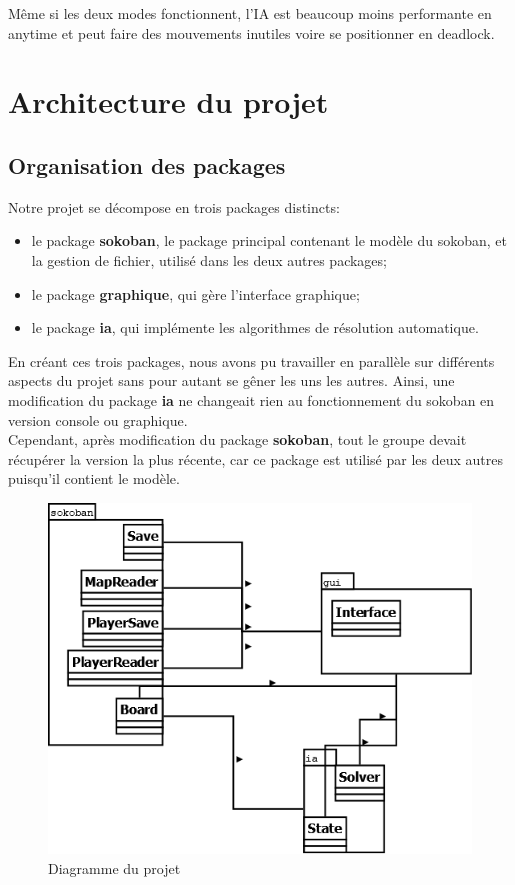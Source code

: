\documentclass[a4paper,12pt]{article} %
\begin{document}
Même si les deux modes fonctionnent, l'IA est beaucoup moins performante en anytime et peut faire des mouvements inutiles voire se positionner en deadlock.

\section{Architecture du projet}

\subsection{Organisation des packages}

Notre projet se décompose en trois packages distincts:
\begin{itemize}
\item le package \textbf{sokoban}, le package principal contenant le modèle du sokoban, et la gestion de fichier, utilisé dans les deux autres packages;
\item le package \textbf{graphique}, qui gère l'interface graphique;
\item le package \textbf{ia}, qui implémente les algorithmes de résolution automatique.
\end{itemize}

En créant ces trois packages, nous avons pu travailler en parallèle sur différents aspects du projet sans pour autant se gêner les uns les autres.
Ainsi, une modification du package \textbf{ia} ne changeait rien au fonctionnement du sokoban en version console ou graphique.\\
Cependant, après modification du package \textbf{sokoban}, tout le groupe devait récupérer la version la plus récente, car ce package est utilisé par les deux autres puisqu'il contient le modèle.

\begin{figure}[!h]
\centering
\includegraphics[scale=0.3]{images/packages.png}
\caption{Diagramme du projet}
\end{figure}
\end{document}

